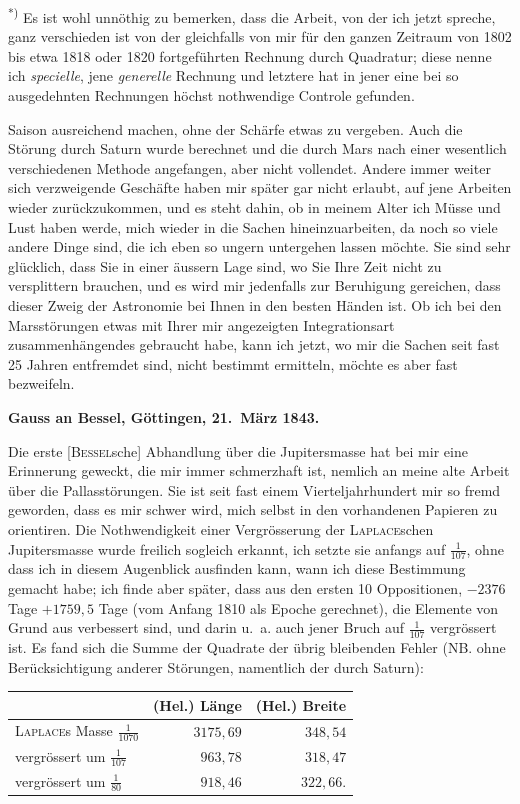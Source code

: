 \documentclass[12pt,a4paper]{article}
\begin{document}
\smallskip\noindent\textsuperscript{*)} Es ist wohl unnöthig zu bemerken, dass die Arbeit, von der ich jetzt spreche, ganz verschieden ist von der gleichfalls von mir für den ganzen Zeitraum von 1802 bis etwa 1818 oder 1820 fortgeführten Rechnung durch Quadratur; diese nenne ich \textit{specielle}, jene \textit{generelle} Rechnung und letztere hat in jener eine bei so ausgedehnten Rechnungen höchst nothwendige Controle gefunden.

\newpage
\setcounter{page}{447}
%
Saison ausreichend machen, ohne der Schärfe etwas zu vergeben. Auch die Störung durch Saturn wurde berechnet und die durch Mars nach einer wesentlich verschiedenen Methode angefangen, aber nicht vollendet. Andere immer weiter sich verzweigende Geschäfte haben mir später gar nicht erlaubt, auf jene Arbeiten wieder zurückzukommen, und es steht dahin, ob in meinem Alter ich Müsse und Lust haben werde, mich wieder in die Sachen hineinzuarbeiten, da noch so viele andere Dinge sind, die ich eben so ungern untergehen lassen möchte. Sie sind sehr glücklich, dass Sie in einer äussern Lage sind, wo Sie Ihre Zeit nicht zu versplittern brauchen, und es wird mir jedenfalls zur Beruhigung gereichen, dass dieser Zweig der Astronomie bei Ihnen in den besten Händen ist. Ob ich bei den Marsstörungen etwas mit Ihrer mir angezeigten Integrationsart zusammenhängendes gebraucht habe, kann ich jetzt, wo mir die Sachen seit fast 25 Jahren entfremdet sind, nicht bestimmt ermitteln, möchte es aber fast bezweifeln.

\medskip\noindent
\textbf{Gauss an Bessel, Göttingen, 21.~März 1843.}

Die erste [\textsc{Bessel}sche] Abhandlung über die Jupitersmasse hat bei mir eine Erinnerung geweckt, die mir immer schmerzhaft ist, nemlich an meine alte Arbeit über die Pallasstörungen. Sie ist seit fast einem Vierteljahrhundert mir so fremd geworden, dass es mir schwer wird, mich selbst in den vorhandenen Papieren zu orientiren. Die Nothwendigkeit einer Vergrösserung der \textsc{Laplace}schen Jupitersmasse wurde freilich sogleich erkannt, ich setzte sie anfangs auf $\frac{1}{107}$, ohne dass ich in diesem Augenblick ausfinden kann, wann ich diese Bestimmung gemacht habe; ich finde aber später, dass aus den ersten 10 Oppositionen, $-2376$ Tage $+1759{,}5$ Tage (vom Anfang 1810 als Epoche gerechnet), die Elemente von Grund aus verbessert sind, und darin u.~a. auch jener Bruch auf $\frac{1}{107}$ vergrössert ist. Es fand sich die Summe der Quadrate der übrig bleibenden Fehler (NB. ohne Berücksichtigung anderer Störungen, namentlich der durch Saturn):
\begin{center}
\begin{tabular}{l@{\quad}r@{\quad}r}
\toprule
& (Hel.) Länge & (Hel.) Breite \\
\midrule
\textsc{Laplace}s Masse $\frac{1}{1070}$ & $3175{,}69$ & $348{,}54$ \\
vergrössert um $\frac{1}{107}$ & $963{,}78$ & $318{,}47$ \\
vergrössert um $\frac{1}{80}$ & $918{,}46$ & $322{,}66$. \\
\bottomrule
\end{tabular}
\end{center}
\end{document}
